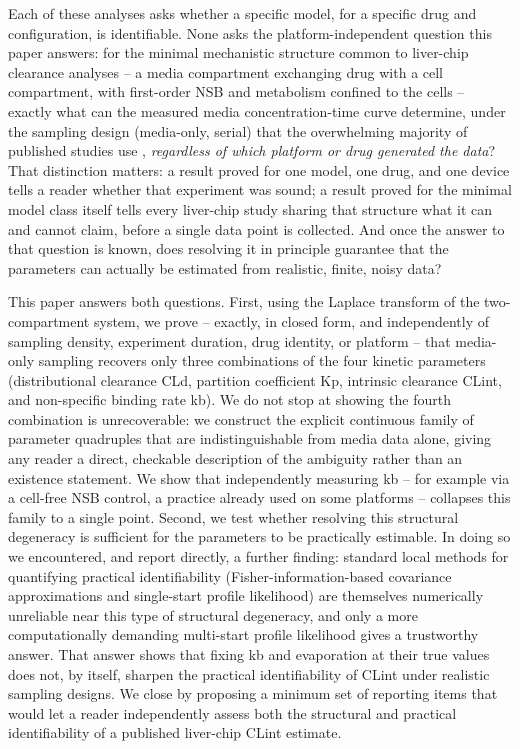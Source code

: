 Each of these analyses asks whether a specific model, for a specific drug and configuration, is identifiable. None asks the platform-independent question this paper answers: for the minimal mechanistic structure common to liver-chip clearance analyses -- a media compartment exchanging drug with a cell compartment, with first-order NSB and metabolism confined to the cells -- exactly what can the measured media concentration-time curve determine, under the sampling design (media-only, serial) that the overwhelming majority of published studies use \citep{docci2022,rajan2023}, \emph{regardless of which platform or drug generated the data}? That distinction matters: a result proved for one model, one drug, and one device tells a reader whether that experiment was sound; a result proved for the minimal model class itself tells every liver-chip study sharing that structure what it can and cannot claim, before a single data point is collected. And once the answer to that question is known, does resolving it in principle guarantee that the parameters can actually be estimated from realistic, finite, noisy data?

This paper answers both questions. First, using the Laplace transform of the two-compartment system, we prove -- exactly, in closed form, and independently of sampling density, experiment duration, drug identity, or platform -- that media-only sampling recovers only three combinations of the four kinetic parameters (distributional clearance CLd, partition coefficient Kp, intrinsic clearance CLint, and non-specific binding rate kb). We do not stop at showing the fourth combination is unrecoverable: we construct the explicit continuous family of parameter quadruples that are indistinguishable from media data alone, giving any reader a direct, checkable description of the ambiguity rather than an existence statement. We show that independently measuring kb -- for example via a cell-free NSB control, a practice already used on some platforms -- collapses this family to a single point. Second, we test whether resolving this structural degeneracy is sufficient for the parameters to be practically estimable. In doing so we encountered, and report directly, a further finding: standard local methods for quantifying practical identifiability (Fisher-information-based covariance approximations and single-start profile likelihood) are themselves numerically unreliable near this type of structural degeneracy, and only a more computationally demanding multi-start profile likelihood gives a trustworthy answer. That answer shows that fixing kb and evaporation at their true values does not, by itself, sharpen the practical identifiability of CLint under realistic sampling designs. We close by proposing a minimum set of reporting items that would let a reader independently assess both the structural and practical identifiability of a published liver-chip CLint estimate.
